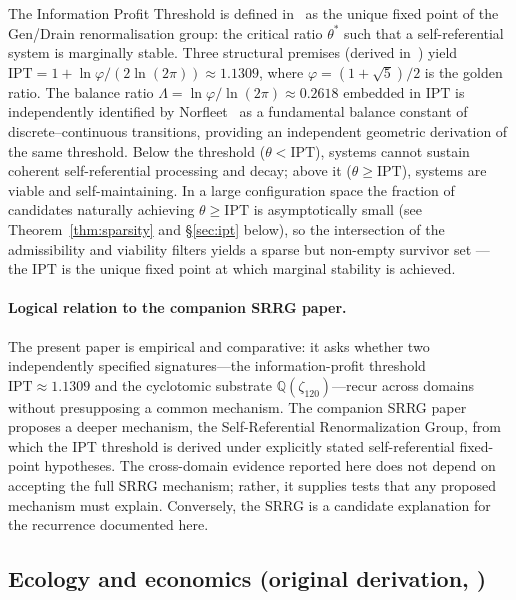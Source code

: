 \documentclass[11pt]{article}
\theoremstyle{remark}
\newcommand{\IPT}{\mathrm{IPT}}
\newcommand{\zetaN}[1]{\zeta_{#1}}
\begin{document}
The Information Profit Threshold is defined in~\cite{SpivackIPT} as the unique
fixed point of the Gen/Drain renormalisation group: the critical ratio
$\theta^*$ such that a self-referential system is marginally stable.
Three structural premises (derived in~\cite{SpivackIPT}) yield
$\IPT = 1 + \ln\varphi/(2\ln(2\pi)) \approx 1.1309$,
where $\varphi = (1+\sqrt{5})/2$ is the golden ratio.
The balance ratio $\Lambda = \ln\varphi/\ln(2\pi) \approx 0.2618$ embedded in $\IPT$ is
independently identified by Norfleet~\cite{NorfleetPrivComm} as a fundamental balance
constant of discrete--continuous transitions, providing an independent geometric
derivation of the same threshold.
Below the threshold ($\theta < \IPT$), systems cannot sustain coherent
self-referential processing and decay; above it ($\theta \geq \IPT$),
systems are viable and self-maintaining.
In a large configuration space the fraction of candidates naturally achieving
$\theta \geq \IPT$ is asymptotically small (see Theorem~\ref{thm:sparsity}
and §\ref{sec:ipt} below), so the intersection of the admissibility and
viability filters yields a sparse but non-empty survivor set ---
the $\IPT$ is the unique fixed point at which marginal stability is achieved.

\paragraph{Logical relation to the companion SRRG paper.}
The present paper is empirical and comparative: it asks whether two
independently specified signatures---the information-profit threshold
$\IPT \approx 1.1309$ and the cyclotomic substrate $\mathbb{Q}(\zetaN{120})$---recur
across domains without presupposing a common mechanism.
The companion SRRG paper~\cite{SpivackSRRG} proposes a deeper mechanism,
the Self-Referential Renormalization Group, from which the IPT threshold is
derived under explicitly stated self-referential fixed-point hypotheses.
The cross-domain evidence reported here does not depend on accepting the full
SRRG mechanism; rather, it supplies tests that any proposed mechanism must
explain. Conversely, the SRRG is a candidate explanation for the recurrence
documented here.

\subsection{\texorpdfstring{Ecology and economics (original derivation, \cite{SpivackIPT})}{Ecology and economics (original derivation)}}
\end{document}
